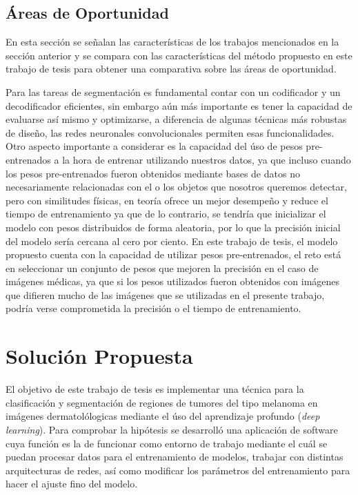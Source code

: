 \section{Áreas de Oportunidad}
En esta sección se señalan las características de los trabajos mencionados en la sección anterior y se compara con las características del método propuesto en este trabajo de tesis para obtener una comparativa sobre las áreas de oportunidad.

Para las tareas de segmentación es fundamental contar con un codificador y un decodificador eficientes, sin embargo aún más importante es tener la capacidad de evaluarse así mismo y optimizarse, a diferencia de algunas técnicas más robustas de diseño, las redes neuronales convolucionales permiten esas funcionalidades. Otro aspecto importante a considerar es la capacidad del úso de pesos pre-entrenados a la hora de entrenar utilizando nuestros datos, ya que incluso cuando los pesos pre-entrenados fueron obtenidos mediante bases de datos no necesariamente relacionadas con el o los objetos que nosotros queremos detectar, pero con similitudes físicas, en teoría ofrece un mejor desempeño y reduce el tiempo de entrenamiento ya que de lo contrario, se tendría que inicializar el modelo con pesos distribuidos de forma aleatoria, por lo que la precisión inicial del modelo sería cercana al cero por ciento. En este trabajo de tesis, el modelo propuesto cuenta con la capacidad de utilizar pesos pre-entrenados, el reto está en seleccionar un conjunto de pesos que mejoren la precisión en el caso de imágenes médicas, ya que si los pesos utilizados fueron obtenidos con imágenes que difieren mucho de las imágenes que se utilizadas en el presente trabajo, podría verse comprometida la precisión o el tiempo de entrenamiento.

\chapter{Solución Propuesta}
El objetivo de este trabajo de tesis es implementar una técnica para la clasificación y segmentación de regiones de tumores del tipo melanoma en imágenes dermatolólogicas mediante el úso del aprendizaje profundo (\emph{deep learning}). Para comprobar la hipótesis se desarrolló una aplicación de software cuya función es la de funcionar como entorno de trabajo mediante el cuál se puedan procesar datos para el entrenamiento de modelos, trabajar con distintas arquitecturas de redes, así como modificar los parámetros del entrenamiento para hacer el ajuste fino del modelo.

